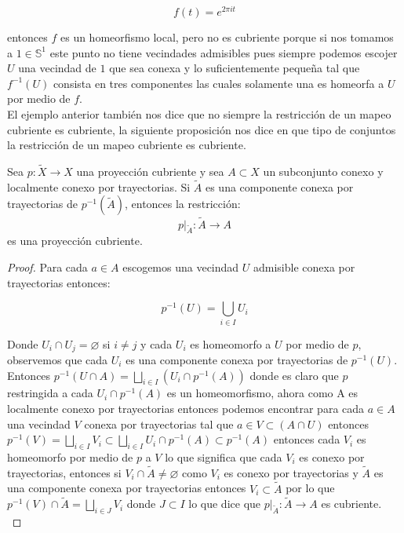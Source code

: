$$ f(t)= e^{2 \pi i t}$$

entonces $f$ es un homeorfismo local, pero no es cubriente porque si nos tomamos a $1 \in \mathbb S^1$ este punto no tiene vecindades admisibles pues siempre podemos escojer $U$ una vecindad de $1$ que sea conexa y lo suficientemente peque\~na tal que $f^{-1}(U)$ consista en tres componentes las cuales solamente una es homeorfa a $U$ por medio de $f$.\\ 


El ejemplo anterior tambi\'en nos dice que no siempre la restricci\'on de un mapeo cubriente es cubriente, la siguiente proposici\'on nos dice en que tipo de conjuntos la restricci\'on de un mapeo cubriente es cubriente.


\begin{proposition}\label{proy ab}
Sea $p: \widetilde{X} \rightarrow X$ una proyecci\'on cubriente y sea $A \subset X$ un subconjunto conexo y localmente conexo por trayectorias. Si $\widetilde{A}$ es una componente conexa por trayectorias de $p^{-1}(\widetilde{A})$, entonces la restricci\'on: 
$$p \vert_{\widetilde{A}}:\widetilde{A} \rightarrow A$$ 
es una proyecci\'on cubriente.\\
\end{proposition}

\begin{proof} 
Para cada $a \in A$ escogemos una vecindad $U$ admisible conexa por trayectorias entonces:

$$p^{-1}(U)=\bigcup_{i \in I}U_i$$ 

Donde $U_i \cap U_j= \varnothing$ si $i \neq j$ y cada $U_i$ es homeomorfo a $U$ por medio de $p$, observemos que cada $U_i$ es una componente conexa por  trayectorias de $p^{-1}(U)$.\\
Entonces $p^{-1}(U \cap A)=\bigsqcup_{i \in I}(U_i \cap p^{-1}(A))$ donde es claro que $p$ restringida a cada $U_i \cap p^{-1}(A)$ es un homeomorfismo, ahora como A es localmente conexo por trayectorias entonces podemos encontrar para cada $a\in A$ una vecindad $V$ conexa por trayectorias tal que $a\in V \subset (A \cap U)$ entonces $p^{-1}(V)=\bigsqcup_{i \in I}V_i \subset \bigsqcup_{i \in I} U_i \cap p^{-1}(A) \subset p^{-1}(A) $ entonces cada $V_i$ es homeomorfo por medio de $p$ a $V$ lo que significa que cada $V_i$ es conexo por trayectorias, entonces si $V_i \cap \widetilde{A} \neq \varnothing$ como $V_i$ es conexo por trayectorias y $\widetilde{A}$ es una componente conexa por trayectorias entonces $V_i \subset \widetilde {A}$ por lo que $p^{-1}(V) \cap \widetilde{A} = \bigsqcup_{i \in J} V_i$ donde $J \subset I$ lo que dice que $p \vert_{\widetilde{A}}:  \widetilde{A} \rightarrow A$ es cubriente.\\
\end{proof}

